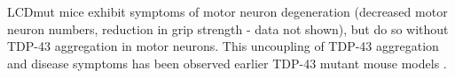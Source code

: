  
 LCDmut mice exhibit symptoms of motor neuron degeneration (decreased motor neuron numbers, reduction in grip strength - data not shown), but do so without TDP-43 aggregation in motor neurons. 
 This uncoupling of TDP-43 aggregation and disease symptoms has been observed earlier TDP-43 mutant mouse models \citep{Arnold2013}.
 
 
%
%
%
%	
%
%
%	
%	



